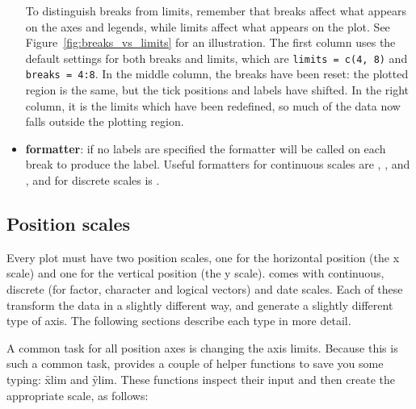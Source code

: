 \begin{itemize}
  To distinguish breaks from limits, remember that breaks affect what appears on the axes and legends, while limits affect what appears on the plot.  See Figure~\ref{fig:breaks_vs_limits} for an illustration.  The first column uses the default settings for both breaks and limits, which are {\tt limits = c(4, 8)} and {\tt breaks = 4:8}.  In the middle column, the breaks have been reset: the plotted region is the same, but the tick positions and labels have shifted.  In the right column, it is the limits which have been redefined, so much of the data now falls outside the plotting region. 
  
    

  \item {\bf formatter}: if no labels are specified the formatter will be called on each break to produce the label.  Useful formatters for continuous scales are , ,  and , and for discrete scales is .
\end{itemize}

\subsection{Position scales}
\label{sub:scale-position}

Every plot must have two position scales, one for the horizontal position (the x scale) and one for the vertical position (the y scale). \ggplot comes with continuous, discrete (for factor, character and logical vectors) and date scales. Each of these transform the data in a slightly different way, and generate a slightly different type of axis. The following sections describe each type in more detail.

A common task for all position axes is changing the axis limits.  Because this is such a common task, \ggplot provides a couple of helper functions to save you some typing: \f{xlim} and \f{ylim}.  These functions inspect their input and then create the appropriate scale, as follows:

